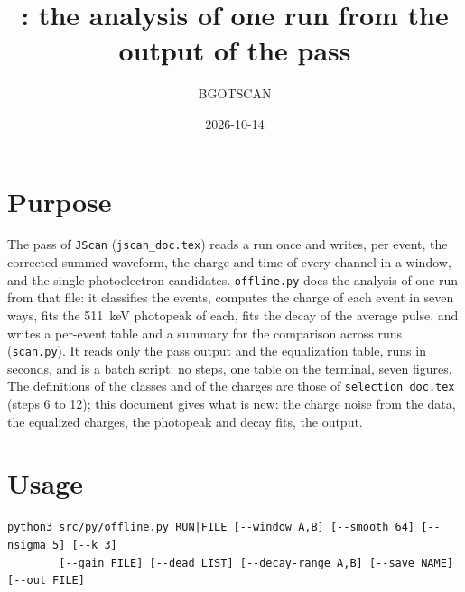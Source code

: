\documentclass[11pt]{article}
\title{\code{offline.py}: the analysis of one run from the output of the pass}
\author{BGOTSCAN}
\date{2026-10-14}
\newcommand{\code}[1]{\texttt{#1}}
\begin{document}
\maketitle

\section{Purpose}

The pass of \code{JScan} (\code{jscan\_doc.tex}) reads a run once and
writes, per event, the corrected summed waveform, the charge and time of
every channel in a window, and the single-photoelectron candidates.
\code{offline.py} does the analysis of one run from that file: it
classifies the events, computes the charge of each event in seven ways,
fits the 511~keV photopeak of each, fits the decay of the average pulse,
and writes a per-event table and a summary for the comparison across runs
(\code{scan.py}). It reads only the pass output and the equalization table,
runs in seconds, and is a batch script: no steps, one table on the
terminal, seven figures. The definitions of the classes and of the charges
are those of \code{selection\_doc.tex} (steps 6 to 12); this document
gives what is new: the charge noise from the data, the equalized charges,
the photopeak and decay fits, the output.

\section{Usage}

\begin{lstlisting}
python3 src/py/offline.py RUN|FILE [--window A,B] [--smooth 64] [--nsigma 5] [--k 3]
        [--gain FILE] [--dead LIST] [--decay-range A,B] [--save NAME] [--out FILE]
\end{lstlisting}
\end{document}
